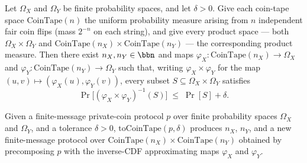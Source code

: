 \begin{theorem}
\label{CommunicationComplexity.Internal.product_coin_approx}
\leanok
{}
Let $\Omega_X$ and $\Omega_Y$ be finite probability spaces, and let $\delta > 0$. Give
each coin-tape space $\mathrm{CoinTape}(n)$ the uniform probability measure arising from
$n$ independent fair coin flips (mass $2^{-n}$ on each string), and give every product
space — both $\Omega_X \times \Omega_Y$ and $\mathrm{CoinTape}(n_X) \times
\mathrm{CoinTape}(n_Y)$ — the corresponding product measure. Then there exist $n_X, n_Y
\in \bbn$ and maps $\varphi_X : \mathrm{CoinTape}(n_X) \to \Omega_X$ and $\varphi_Y :
\mathrm{CoinTape}(n_Y) \to \Omega_Y$ such that, writing $\varphi_X \times \varphi_Y$ for
the map $(u,v) \mapsto (\varphi_X(u), \varphi_Y(v))$, every subset $S \subseteq \Omega_X
\times \Omega_Y$ satisfies
\[
  \Pr\!\big[(\varphi_X \times \varphi_Y)^{-1}(S)\big] \;\le\; \Pr[S] + \delta .
\]
\end{theorem}

\begin{definition}
\label{CommunicationComplexity.PrivateCoin.FiniteMessage.Protocol.toCoinTape}
\leanok
{}
Given a finite-message private-coin protocol $p$ over finite probability spaces $\Omega_X$
and $\Omega_Y$, and a tolerance $\delta > 0$, $\mathrm{toCoinTape}(p, \delta)$ produces
$n_X$, $n_Y$, and a new finite-message protocol over $\mathrm{CoinTape}(n_X) \times
\mathrm{CoinTape}(n_Y)$ obtained by precomposing $p$ with the inverse-CDF approximating
maps $\varphi_X$ and $\varphi_Y$.
\end{definition}


